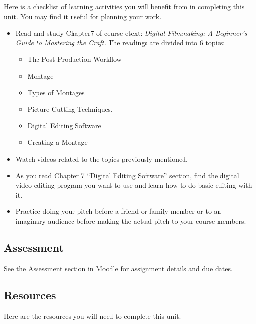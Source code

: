 \documentclass[
]{book}
\providecommand{\tightlist}{%
  \setlength{\itemsep}{0pt}\setlength{\parskip}{0pt}}
\begin{document}
\begin{reflect}
Here is a checklist of learning activities you will benefit from in completing this unit. You may find it useful for planning your work.

\begin{itemize}
\item
  Read and study Chapter7 of course etext: \emph{Digital Filmmaking: A Beginner's Guide to Mastering the Craft.} The readings are divided into 6 topics:

  \begin{itemize}
  \tightlist
  \item
    The Post-Production Workflow
  \item
    Montage
  \item
    Types of Montages
  \item
    Picture Cutting Techniques.
  \item
    Digital Editing Software
  \item
    Creating a Montage
  \end{itemize}
\item
  Watch videos related to the topics previously mentioned.
\item
  As you read Chapter 7 ``Digital Editing Software'' section, find the digital video editing program you want to use and learn how to do basic editing with it.
\item
  Practice doing your pitch before a friend or family member or to an imaginary audience before making the actual pitch to your course members.
\end{itemize}
\end{reflect}

\hypertarget{assessment-12}{%
\subsection*{Assessment}\label{assessment-12}}

See the Assessment section in Moodle for assignment details and due dates.

\hypertarget{resources-6}{%
\subsection*{Resources}\label{resources-6}}

Here are the resources you will need to complete this unit.
\end{document}
